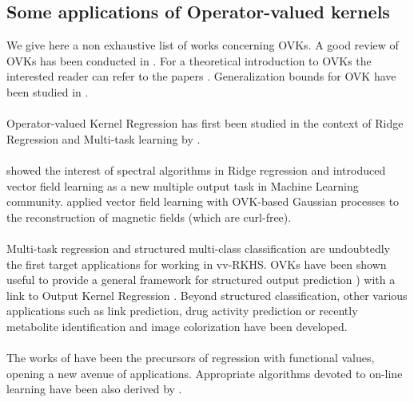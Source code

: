 \subsection{Some applications of Operator-valued kernels}
We give here a non exhaustive list of works concerning \aclp{OVK}.  A good
review of \aclp{OVK} has been conducted in \citet{Alvarez2012}. For a
theoretical introduction to \acsp{OVK} the interested reader can refer to the
papers \citet{carmeli2006vector, caponnetto2008, Carmeli2010}. Generalization
bounds for \acs{OVK} have been studied in \citet{Sindhwani2013,
kadri2015operator,sangnier2016joint, maurer2016vector}.
\paragraph{}
Operator-valued Kernel Regression has first been studied in the context of
Ridge Regression and Multi-task learning by \citet{Micchelli2005}.
\paragraph{}
\citet{Macedo2008, Baldassare2012} showed the interest of spectral algorithms
in Ridge regression and introduced vector field learning as a new multiple
output task in Machine Learning community. \citet{Wahlstrom2013} applied vector
field learning with \acs{OVK}-based Gaussian processes to the reconstruction of
magnetic fields (which are curl-free).
\paragraph{}
Multi-task regression \citet{micchelli2004kernels}  and structured multi-class
classification \citep{Dinuzzo2011,minh2013unifying,mroueh2012multiclass} are
undoubtedly the first target applications for working in \acl{vv-RKHS}.
\aclp{OVK} have been shown useful to provide a general framework for structured
output prediction \citep{Brouard2011,Brouard2016_jmlr}) with a link to Output
Kernel Regression \citep{Kadri_icml2013}. Beyond structured classification,
other various applications such as link prediction, drug activity prediction or
recently metabolite identification \citep{brouard2016fast} and  image
colorization \citep{ha2010image} have been developed.
\paragraph{}
The works of \citet{Kadri_aistat10,kadri2015operator} have been the precursors
of  regression with functional values, opening a new avenue of applications.
Appropriate algorithms devoted to on-line learning have been also derived  by
\citet{audiffren2013online}.
